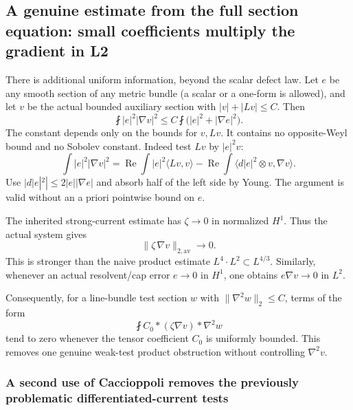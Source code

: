 \hypertarget{proof:web-radial-measure:s5}{%
\subsection{A genuine estimate from the full section equation: small coefficients multiply the gradient in L2}\label{proof:web-radial-measure:s5}}

There is additional uniform information, beyond the scalar defect law. Let \(e\) be any smooth section of any metric bundle (a scalar or a one-form is allowed), and let \(v\) be the actual bounded auxiliary section with \(|v|+|Lv|\le C\). Then \[
 \boxed{\fint |e|^2|\nabla v|^2
 \le C\fint\bigl(|e|^2+|\nabla e|^2\bigr).}
 \tag{\thesection.12}\label{proof:web-radial-measure:e12}
\] The constant depends only on the bounds for \(v,Lv\). It contains no opposite-Weyl bound and no Sobolev constant. Indeed test \(Lv\) by \(|e|^2v\): \[
 \int |e|^2|\nabla v|^2
 =\operatorname{Re}\int |e|^2\langle Lv,v\rangle
 -\operatorname{Re}\int \langle d|e|^2\otimes v,\nabla v\rangle.
\] Use \(|d|e|^2|\le2|e||\nabla e|\) and absorb half of the left side by Young. The argument is valid without an a priori pointwise bound on \(e\).

The inherited strong-current estimate has \(\zeta\to0\) in normalized \(H^1\). Thus the actual system gives \[
 \boxed{\|\zeta\,\nabla v\|_{2,\mathrm{av}}\to0.}
 \tag{\thesection.13}\label{proof:web-radial-measure:e13}
\] This is stronger than the naive product estimate \(L^4\cdot L^2\subset L^{4/3}\). Similarly, whenever an actual resolvent/cap error \(e\to0\) in \(H^1\), one obtains \(e\nabla v\to0\) in \(L^2\).

Consequently, for a line-bundle test section \(w\) with \(\|\nabla^2w\|_2\le C\), terms of the form \[
 \fint C_0*(\zeta\nabla v)*\nabla^2w
\] tend to zero whenever the tensor coefficient \(C_0\) is uniformly bounded. This removes one genuine weak-test product obstruction without controlling \(\nabla^2v\).

\hypertarget{proof:web-radial-measure:A-second-use-of-Caccioppoli-removes-the-previously-problematic-differentiated-current-tests}{%
\subsubsection{A second use of Caccioppoli removes the previously problematic differentiated-current tests}\label{proof:web-radial-measure:A-second-use-of-Caccioppoli-removes-the-previously-problematic-differentiated-current-tests}}

